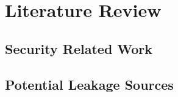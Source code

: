 \chapter{Literature Review} \label{Chp: LiteratureReview}

%
%

\section{Security Related Work}

\section{Potential Leakage Sources} \label{Sec: Leakage Sources}
